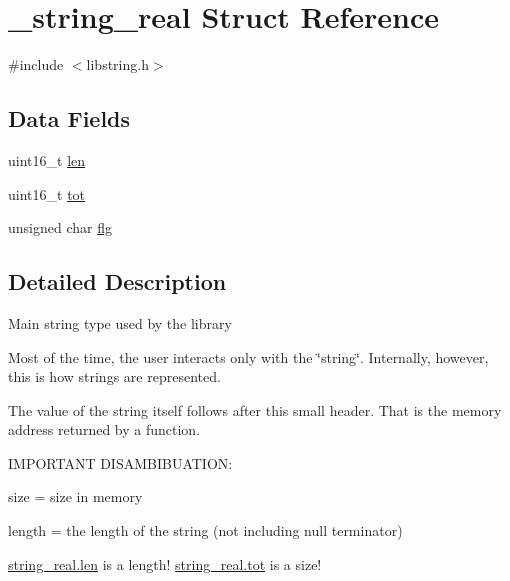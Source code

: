 \hypertarget{struct__string__real}{\section{\-\_\-string\-\_\-real Struct Reference}
\label{struct__string__real}
}


{\ttfamily \#include $<$libstring.\-h$>$}

\subsection*{Data Fields}
\begin{DoxyCompactItemize}
\item 
uint16\-\_\-t \hyperlink{struct__string__real_a4c51041b496d561d8ea8c8af4aa34ea5}{len}
\item 
uint16\-\_\-t \hyperlink{struct__string__real_a0a2aeea98f557b0e98e15aa42414e855}{tot}
\item 
unsigned char \hyperlink{struct__string__real_ac23d3f9fe5d59437dece0bc99488ef85}{flg}
\end{DoxyCompactItemize}


\subsection{Detailed Description}
Main string type used by the library

Most of the time, the user interacts only with the \char`\"{}string\char`\"{}. Internally, however, this is how strings are represented.

The value of the string itself follows after this small header. That is the memory address returned by a function.

I\-M\-P\-O\-R\-T\-A\-N\-T D\-I\-S\-A\-M\-B\-I\-B\-U\-A\-T\-I\-O\-N\-:


\begin{DoxyItemize}
\item size = size in memory
\item length = the length of the string (not including null terminator)
\end{DoxyItemize}

\hyperlink{struct__string__real_a4c51041b496d561d8ea8c8af4aa34ea5}{string\-\_\-real.\-len} is a length! \hyperlink{struct__string__real_a0a2aeea98f557b0e98e15aa42414e855}{string\-\_\-real.\-tot} is a size! 

